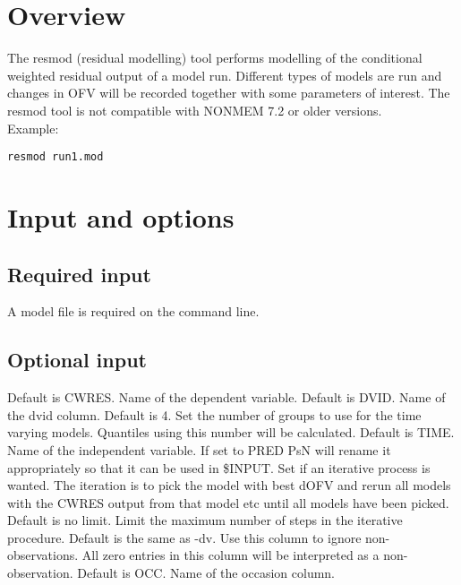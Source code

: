 



\maketitle
\newcommand{\guidetoolname}{resmod}


\section{Overview}
The resmod (residual modelling) tool performs modelling of the conditional weighted residual output of a model run. Different types of models are run and changes in OFV will be recorded together with some parameters of interest. The resmod tool is not compatible with NONMEM 7.2 or older versions.\\
Example:
\begin{verbatim}
resmod run1.mod
\end{verbatim}

\section{Input and options}

\subsection{Required input}
A model file is required on the command line.

\subsection{Optional input}

\begin{optionlist}
Default is CWRES. Name of the dependent variable. 
\nextopt
{}
Default is DVID. Name of the dvid column. 
\nextopt
{}
Default is 4. Set the number of groups to use for the time varying models. Quantiles using this number will be calculated.
\nextopt
{}
Default is TIME. Name of the independent variable. If set to PRED PsN will rename it appropriately so that it can be used in \$INPUT.
\nextopt
{}
Set if an iterative process is wanted. The iteration is to pick the model with best dOFV and rerun all models with the CWRES output from that model etc until all models have been picked.
\nextopt
{}
Default is no limit. Limit the maximum number of steps in the iterative procedure. 
\nextopt
{}
Default is the same as -dv. Use this column to ignore non-observations. All zero entries in this column will be interpreted as a non-observation.
\nextopt
{}
Default is OCC. Name of the occasion column. 
\nextopt
\end{optionlist}

